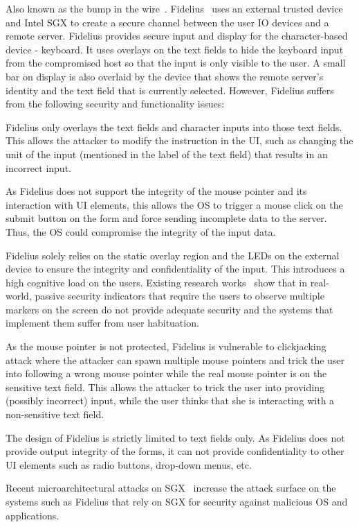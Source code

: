   Also known as the bump in the wire~\cite{McCPerRei2006}. Fidelius~\cite{Fidelius} uses an external trusted device and Intel SGX to create a secure channel between the user IO devices and a remote server. Fidelius provides secure input and display for the character-based device - keyboard. It uses overlays on the text fields to hide the keyboard input from the compromised host so that the input is only visible to the user. A small bar on display is also overlaid by the device that shows the remote server's identity and the text field that is currently selected. However, Fidelius suffers from the following security and functionality issues: 
\vspace{-0.5em}
\begin{mylist}
\item Fidelius only overlays the text fields and character inputs into those text fields. This allows the attacker to modify the instruction in the UI, such as changing the unit of the input (mentioned in the label of the text field) that results in an incorrect input. 
\item As Fidelius does not support the integrity of the mouse pointer and its interaction with UI elements, this allows the OS to trigger a mouse click on the submit button on the form and force sending incomplete data to the server. Thus, the OS could compromise the integrity of the input data. 
\item Fidelius solely relies on the static overlay region and the LEDs on the external device to ensure the integrity and confidentiality of the input. This introduces a high cognitive load on the users. Existing research works~\cite{egelman2008you,sobey2008exploring} show that in real-world, passive security indicators that require the users to observe multiple markers on the screen do not provide adequate security and the systems that implement them suffer from user habituation.
\item As the mouse pointer is not protected, Fidelius is vulnerable to clickjacking attack where the attacker can spawn multiple mouse pointers and trick the user into following a wrong mouse pointer while the real mouse pointer is on the sensitive text field. This allows the attacker to trick the user into providing (possibly incorrect) input, while the user thinks that she is interacting with a non-sensitive text field.
\item The design of Fidelius is strictly limited to text fields only. As Fidelius does not provide output integrity of the forms, it can not provide confidentiality to other UI elements such as radio buttons, drop-down menus, etc.
\item Recent microarchitectural attacks on SGX~\cite{van2018foreshadow} increase the attack surface on the systems such as Fidelius that rely on SGX for security against malicious OS and applications. 
\end{mylist}


